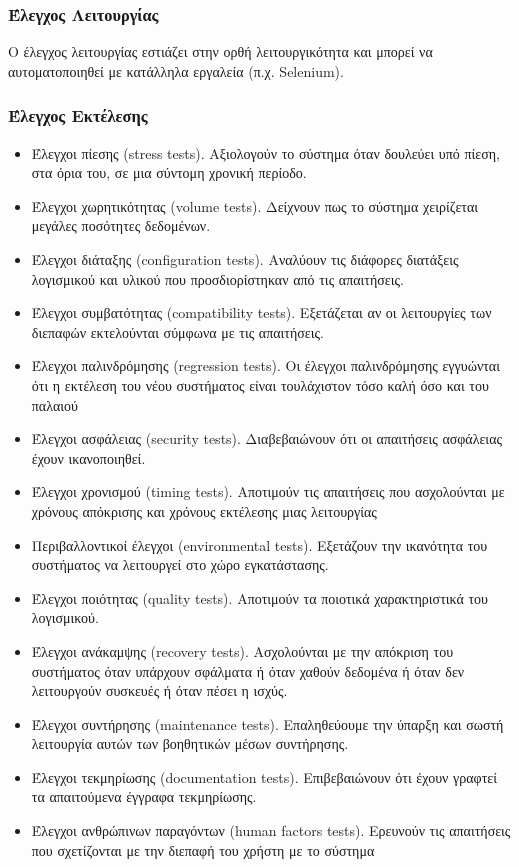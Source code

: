 \documentclass[a4paper, 11pt]{article}
\begin{document}
{{\subsubsection{Έλεγχος Λειτουργίας}
Ο έλεγχος λειτουργίας εστιάζει στην ορθή λειτουργικότητα και
μπορεί να αυτοματοποιηθεί με κατάλληλα εργαλεία (π.χ. \textlatin{Selenium}).
\subsubsection{Έλεγχος Εκτέλεσης}
\begin{itemize}
\item Έλεγχοι πίεσης \textlatin{(stress tests)}. Aξιολογούν το σύστημα όταν δουλεύει υπό πίεση, στα όρια του, σε μια σύντομη χρονική περίοδο.
\item Έλεγχοι χωρητικότητας \textlatin{(volume tests)}. Δείχνουν πως το σύστημα χειρίζεται μεγάλες ποσότητες δεδομένων.
\item Έλεγχοι διάταξης \textlatin{(configuration tests)}. Αναλύουν τις διάφορες διατάξεις λογισμικού και υλικού που προσδιορίστηκαν από τις απαιτήσεις.
\item Έλεγχοι συμβατότητας \textlatin{(compatibility tests)}. Εξετάζεται αν οι λειτουργίες των διεπαφών εκτελούνται σύμφωνα με τις απαιτήσεις. 
\item Έλεγχοι παλινδρόμησης \textlatin{(regression tests)}. Οι έλεγχοι παλινδρόμησης εγγυώνται ότι η εκτέλεση του νέου συστήματος είναι τουλάχιστον τόσο καλή όσο και του παλαιού
\item Έλεγχοι ασφάλειας \textlatin{(security tests)}. Διαβεβαιώνουν ότι οι απαιτήσεις ασφάλειας έχουν ικανοποιηθεί.
\item Έλεγχοι χρονισμού \textlatin{(timing tests)}. Αποτιμούν τις απαιτήσεις που ασχολούνται με χρόνους απόκρισης και χρόνους εκτέλεσης μιας λειτουργίας
\item Περιβαλλοντικοί έλεγχοι \textlatin{(environmental tests)}. Εξετάζουν την ικανότητα του συστήματος να λειτουργεί στο χώρο εγκατάστασης. 
\item Έλεγχοι ποιότητας \textlatin{(quality tests)}. Αποτιμούν τα ποιοτικά χαρακτηριστικά του λογισμικού.
\item Έλεγχοι ανάκαμψης \textlatin{(recovery tests)}. Ασχολούνται με την απόκριση του συστήματος όταν υπάρχουν σφάλματα ή όταν χαθούν δεδομένα ή όταν δεν λειτουργούν συσκευές ή όταν πέσει η ισχύς. 
\item Έλεγχοι συντήρησης \textlatin{(maintenance tests)}. Επαληθεύουμε την ύπαρξη και σωστή λειτουργία αυτών των βοηθητικών μέσων συντήρησης.
\item Έλεγχοι τεκμηρίωσης \textlatin{(documentation tests)}. Επιβεβαιώνουν ότι έχουν γραφτεί τα απαιτούμενα έγγραφα τεκμηρίωσης.
\item Έλεγχοι ανθρώπινων παραγόντων \textlatin{(human factors tests)}. Ερευνούν τις απαιτήσεις που σχετίζονται με την διεπαφή του χρήστη με το σύστημα
\end{itemize}

}}
\end{document}
